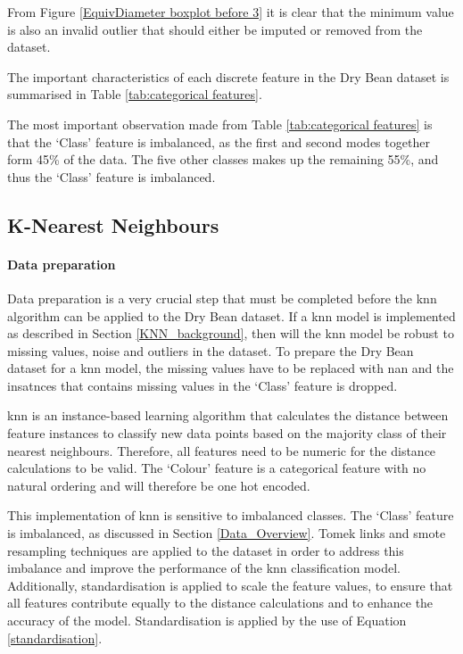 \documentclass[10pt, conference]{IEEEtran}
\begin{document}
From Figure \ref{EquivDiameter boxplot before 3} it is clear that the minimum value is also an invalid outlier
that should either be imputed or removed from the dataset.

The important characteristics of each discrete feature in the Dry Bean dataset is summarised in Table
\ref{tab:categorical features}.

The most important observation made from Table \ref{tab:categorical features} is that the `Class' feature
is imbalanced, as the first and second modes together form 45\% of the data. The five other classes
makes up the remaining 55\%, and thus the `Class' feature is imbalanced.

\subsection{K-Nearest Neighbours}

\paragraph{Data preparation}

Data preparation is a very crucial step that must be completed before the \acrshort{knn} algorithm can be applied to the Dry
Bean dataset. If a \acrshort{knn} model is implemented as described in Section \ref{KNN_background}, then
will the \acrshort{knn} model be robust to missing values, noise and outliers in the dataset. To prepare
the Dry Bean dataset for a \acrshort{knn} model, the missing values have to be replaced with \acrshort{nan}
and the insatnces that contains missing values in the `Class' feature is dropped.

\acrshort{knn} is an instance-based learning algorithm that calculates the distance between feature
instances to classify new data points based on the majority class of their nearest neighbours. Therefore, all features need
to be numeric for the distance calculations to be valid. The `Colour' feature is a categorical feature with no
natural ordering and will therefore be one hot encoded.

This implementation of \acrshort{knn} is sensitive to imbalanced classes. The `Class' feature is imbalanced, as
discussed in Section \ref{Data_Overview}. Tomek links and \acrshort{smote} resampling techniques are applied to the
dataset in order to address this imbalance and improve the performance of the \acrshort{knn} classification model.
Additionally, standardisation is applied to scale the feature values, to ensure that all features contribute
equally to the distance calculations and to enhance the accuracy of the model. Standardisation is applied
by the use of Equation \eqref{standardisation}.
\end{document}
